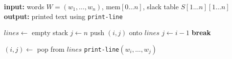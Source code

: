 \documentclass[a4paper,11pt]{article}
\begin{document}
	\begin{algorithm}[H]
		\caption{Pretty-print by reconstructing from $\text{mem}$ and $S$}
		\label{alg:pretty_print_reconstruct_scan}
		\begin{algorithmic}[1]
			\State \textbf{input:} words $W = (w_1,\dots,w_n)$, $\text{mem}[0\dots n]$, slack table $S[1\dots n][1\dots n]$
			\State \textbf{output:} printed text using \texttt{print-line}

			\State $lines \gets$ empty stack 
			\State $j \gets n$
			\State push $(i,j)$ onto $lines$
			\State $j \gets i-1$
			\State \textbf{break}
			\EndIf
			\EndFor
			\EndWhile

			\State $(i,j) \gets$ pop from $lines$
			\State \texttt{print-line}$(w_i,\dots,w_j)$
			\EndWhile
		\end{algorithmic}
	\end{algorithm}
\end{document}
